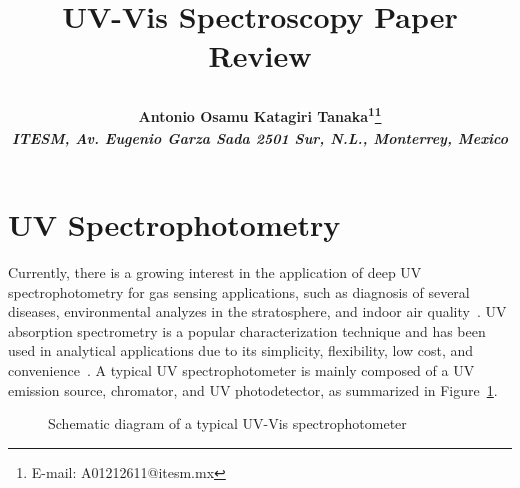 \documentclass[11pt]{article}
\makeatletter
\def\NormalBaseline{\def\baselinestretch{1.1}}
\def\@shorttitle{\@empty}
\def\shorttitle#1{\gdef\@shorttitle{#1}}
\def\fixFloatSize#1{}%
\makeatother
\begin{document}
\renewcommand*\rmdefault{bch}\normalfont\upshape

\shorttitle{Class Assignment}

\date{}  

  
\title{\NormalBaseline\raggedright\bfseries UV-Vis Spectroscopy {\textemdash} Paper Review}
  \let\origthanks\thanks
\renewcommand\thanks[1]{\begingroup\let\rlap\relax\origthanks{#1}\endgroup}
\author{\hskip2pc\parbox{.95\textwidth}{\bfseries\large Antonio Osamu Katagiri Tanaka\textsuperscript{1}\thanks{E-mail: A01212611@itesm.mx}
      \\[3pt] 
    \normalfont\itshape\NormalBaseline \textsuperscript{} 
    ITESM\unskip, \normalfont\itshape\NormalBaseline Av. Eugenio Garza Sada 2501 Sur\unskip, N.L.\unskip, Monterrey\unskip, Mexico}}
    
    
\maketitle 
\pagestyle{custom}

    
\section{UV Spectrophotometry}
Currently, there is a growing interest in the application of deep UV spectrophotometry for gas sensing applications, such as diagnosis of several diseases, environmental analyzes in the stratosphere, and indoor air quality\unskip~\cite{693772:16434827}. UV absorption spectrometry is a popular characterization technique and has been used in analytical applications due to its simplicity, flexibility, low cost, and convenience\unskip~\cite{693772:16435120}. A typical UV spectrophotometer is mainly composed of a UV emission source, chromator, and UV photodetector, as summarized in Figure~\ref{f-82062f273073}.


\bgroup
\fixFloatSize{images/7e7bd118-08b0-4344-a5b9-14ff939eb63e-uschematicdiagramuvvisspectrophotometer.png}
\begin{figure}[!htbp]
\centering \makeatletter{}
\makeatother 
\caption{{Schematic diagram of a typical UV-Vis spectrophotometer \unskip~\protect\cite{693772:16435037}}}
\label{f-82062f273073}
\end{figure}
\egroup
\end{document}
